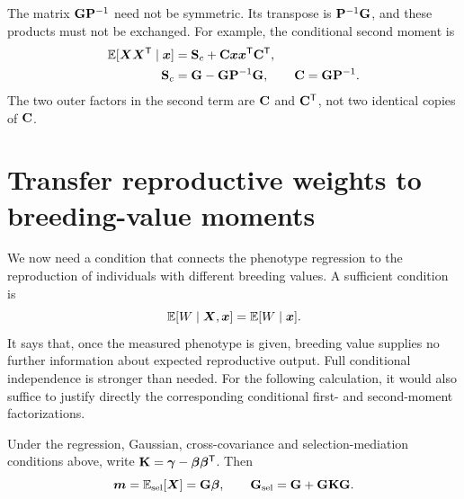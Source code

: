 The matrix \(\mathbf{G}\mathbf{P}^{-1}\) need not be symmetric. Its transpose is
\(\mathbf{P}^{-1}\mathbf{G}\), and these products must not be exchanged. For example,
the conditional second moment is
\begin{align}
 \mathbb E[\boldsymbol{X}\boldsymbol{X}^{\mathsf T}\mid\boldsymbol{x}]
 &=\mathbf{S}_c+\mathbf{C}\boldsymbol{x}\boldsymbol{x}^{\mathsf T}\mathbf{C}^{\mathsf T},\nonumber\\
 \mathbf{S}_c&=\mathbf{G}-\mathbf{G}\mathbf{P}^{-1}\mathbf{G},\qquad
 \mathbf{C}=\mathbf{G}\mathbf{P}^{-1}.
 \label{conversion:conditional_second}
\end{align}
The two outer factors in the second term are \(\mathbf{C}\) and
\(\mathbf{C}^{\mathsf T}\), not two identical copies of \(\mathbf{C}\).

\section{Transfer reproductive weights to breeding-value moments}
\label{conversion:breeding_moments}

We now need a condition that connects the phenotype regression to the
reproduction of individuals with different breeding values. A sufficient
condition is
\begin{equation}
 \mathbb E[W\mid\boldsymbol{X},\boldsymbol{x}]=\mathbb E[W\mid\boldsymbol{x}].
 \label{conversion:mediation}
\end{equation}
It says that, once the measured phenotype is given, breeding value supplies
no further information about expected reproductive output. Full conditional
independence is stronger than needed. For the following calculation, it
would also suffice to justify directly the corresponding conditional
first- and second-moment factorizations.

\begin{proposition}
\label{conversion:selected_breeding_moments}
Under the regression, Gaussian, cross-covariance and selection-mediation
conditions above, write
\(\mathbf{K}=\boldsymbol{\gamma}-\boldsymbol{\beta}\boldsymbol{\beta}^{\mathsf T}\).
Then
\begin{equation}
 \boldsymbol{m}=\mathbb E_{\rm sel}[\boldsymbol{X}]=\mathbf{G}\boldsymbol{\beta},\qquad
 \mathbf{G}_{\mathrm{sel}}=\mathbf{G}+\mathbf{G}\mathbf{K}\mathbf{G}.
 \label{conversion:selected_formula}
\end{equation}
\end{proposition}

